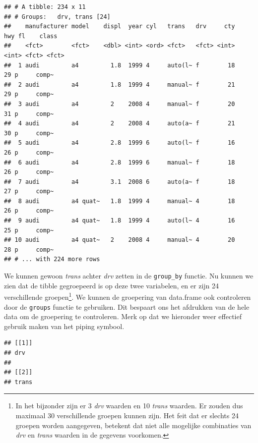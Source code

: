 \documentclass[]{tufte-book}
\newenvironment{Shaded}{}{}
\newcommand{\KeywordTok}[1]{\textcolor[rgb]{0.00,0.44,0.13}{\textbf{#1}}}
\newcommand{\NormalTok}[1]{#1}
\newcommand{\OperatorTok}[1]{\textcolor[rgb]{0.40,0.40,0.40}{#1}}
\newcommand{\StringTok}[1]{\textcolor[rgb]{0.25,0.44,0.63}{#1}}
\begin{document}
\begin{verbatim}
## # A tibble: 234 x 11
## # Groups:   drv, trans [24]
##    manufacturer model    displ  year cyl   trans   drv     cty   hwy fl    class
##    <fct>        <fct>    <dbl> <int> <ord> <fct>   <fct> <int> <int> <fct> <fct>
##  1 audi         a4         1.8  1999 4     auto(l~ f        18    29 p     comp~
##  2 audi         a4         1.8  1999 4     manual~ f        21    29 p     comp~
##  3 audi         a4         2    2008 4     manual~ f        20    31 p     comp~
##  4 audi         a4         2    2008 4     auto(a~ f        21    30 p     comp~
##  5 audi         a4         2.8  1999 6     auto(l~ f        16    26 p     comp~
##  6 audi         a4         2.8  1999 6     manual~ f        18    26 p     comp~
##  7 audi         a4         3.1  2008 6     auto(a~ f        18    27 p     comp~
##  8 audi         a4 quat~   1.8  1999 4     manual~ 4        18    26 p     comp~
##  9 audi         a4 quat~   1.8  1999 4     auto(l~ 4        16    25 p     comp~
## 10 audi         a4 quat~   2    2008 4     manual~ 4        20    28 p     comp~
## # ... with 224 more rows
\end{verbatim}

We kunnen gewoon \emph{trans} achter \emph{drv} zetten in de \texttt{group\_by} functie. Nu kunnen we zien dat de tibble gegroepeerd is op deze twee variabelen, en er zijn 24 verschillende groepen\footnote{In het bijzonder zijn er 3 \emph{drv} waarden en 10 \emph{trans} waarden. Er zouden dus maximaal 30 verschillende groepen kunnen zijn. Het feit dat er slechts 24 groepen worden aangegeven, betekent dat niet alle mogelijke combinaties van \emph{drv} en \emph{trans} waarden in de gegevens voorkomen.}. We kunnen de groepering van data.frame ook controleren door de \texttt{groups} functie te gebruiken. Dit bespaart ons het afdrukken van de hele data om de groepering te controleren. Merk op dat we hieronder weer effectief gebruik maken van het piping symbool.

\begin{Shaded}
\end{Shaded}

\begin{verbatim}
## [[1]]
## drv
## 
## [[2]]
## trans
\end{verbatim}
\end{document}
